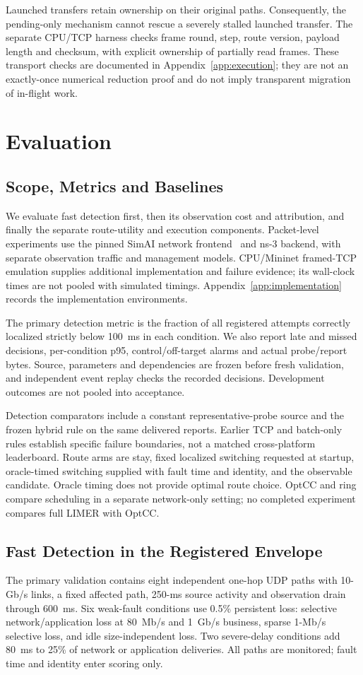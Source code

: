 \documentclass[sigconf]{acmart}
\begin{document}
Launched transfers retain ownership on their original paths. Consequently,
the pending-only mechanism cannot rescue a severely stalled launched
transfer. The separate CPU/TCP harness checks frame round, step, route
version, payload length and checksum, with explicit ownership of partially
read frames. These transport checks are documented in
Appendix~\ref{app:execution}; they are not an exactly-once numerical reduction
proof and do not imply transparent migration of in-flight work.

\section{Evaluation}
\subsection{Scope, Metrics and Baselines}
We evaluate fast detection first, then its observation cost and attribution,
and finally the separate route-utility and execution components. Packet-level
experiments use the pinned SimAI network frontend~\cite{simai2025} and ns-3 backend, with
separate observation traffic and management models. CPU/Mininet framed-TCP
emulation supplies additional implementation and failure evidence; its
wall-clock times are not pooled with simulated timings.
Appendix~\ref{app:implementation} records the implementation environments.

The primary detection metric is the fraction of all registered attempts
correctly localized strictly below 100~ms in each condition. We also report
late and missed decisions, per-condition p95, control/off-target alarms and
actual probe/report bytes. Source, parameters and dependencies are frozen
before fresh validation, and independent event replay checks the recorded
decisions. Development outcomes are not pooled into acceptance.

Detection comparators include a constant representative-probe source and
the frozen hybrid rule on the same delivered reports. Earlier TCP and
batch-only rules establish specific failure boundaries, not a matched
cross-platform leaderboard. Route arms are stay, fixed localized switching
requested at startup, oracle-timed switching supplied with fault time and
identity, and the observable candidate. Oracle timing does not provide
optimal route choice. OptCC and ring compare scheduling in a separate
network-only setting; no completed experiment compares full LIMER with OptCC.

\subsection{Fast Detection in the Registered Envelope}
\label{sec:primary-validation}
The primary validation contains eight independent one-hop UDP paths with
10-Gb/s links, a fixed affected path, 250-ms source activity and observation
drain through 600~ms. Six weak-fault conditions use 0.5\% persistent loss:
selective network/application loss at 80~Mb/s and 1~Gb/s business, sparse
1-Mb/s selective loss, and idle size-independent loss. Two severe-delay
conditions add 80~ms to 25\% of network or application deliveries. All paths
are monitored; fault time and identity enter scoring only.
\end{document}
